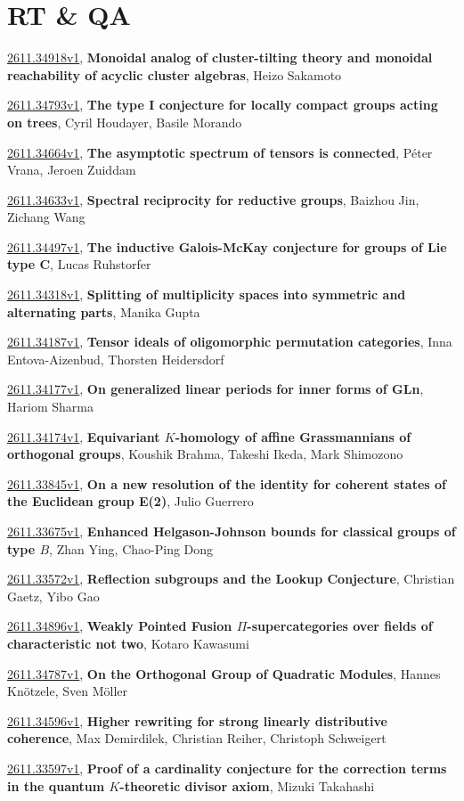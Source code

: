 \documentclass[9pt, a4paper]{article}
\theoremstyle{plain}
\theoremstyle{definition}
\theoremstyle{remark}
\newcommand{\arxiv}[3]{\href{https://arxiv.org/abs/#1}{#1}, \textbf{\textcolor{arxivblue}{#2}}, #3}
\begin{document}

\section{RT \& QA}
\arxiv{2611.34918v1}{Monoidal analog of cluster-tilting theory and monoidal reachability of acyclic cluster algebras}{Heizo Sakamoto}

\arxiv{2611.34793v1}{The type I conjecture for locally compact groups acting on trees}{Cyril Houdayer, Basile Morando}

\arxiv{2611.34664v1}{The asymptotic spectrum of tensors is connected}{Péter Vrana, Jeroen Zuiddam}

\arxiv{2611.34633v1}{Spectral reciprocity for reductive groups}{Baizhou Jin, Zichang Wang}

\arxiv{2611.34497v1}{The inductive Galois-McKay conjecture for groups of Lie type C}{Lucas Ruhstorfer}

\arxiv{2611.34318v1}{Splitting of multiplicity spaces into symmetric and alternating parts}{Manika Gupta}

\arxiv{2611.34187v1}{Tensor ideals of oligomorphic permutation categories}{Inna Entova-Aizenbud, Thorsten Heidersdorf}

\arxiv{2611.34177v1}{On generalized linear periods for inner forms of GLn}{Hariom Sharma}

\arxiv{2611.34174v1}{Equivariant $K$-homology of affine Grassmannians of orthogonal groups}{Koushik Brahma, Takeshi Ikeda, Mark Shimozono}

\arxiv{2611.33845v1}{On a new resolution of the identity for coherent states of the Euclidean group E(2)}{Julio Guerrero}

\arxiv{2611.33675v1}{Enhanced Helgason-Johnson bounds for classical groups of type $B$}{Zhan Ying, Chao-Ping Dong}

\arxiv{2611.33572v1}{Reflection subgroups and the Lookup Conjecture}{Christian Gaetz, Yibo Gao}

\arxiv{2611.34896v1}{Weakly Pointed Fusion $Π$-supercategories over fields of characteristic not two}{Kotaro Kawasumi}

\arxiv{2611.34787v1}{On the Orthogonal Group of Quadratic Modules}{Hannes Knötzele, Sven Möller}

\arxiv{2611.34596v1}{Higher rewriting for strong linearly distributive coherence}{Max Demirdilek, Christian Reiher, Christoph Schweigert}

\arxiv{2611.33597v1}{Proof of a cardinality conjecture for the correction terms in the quantum $K$-theoretic divisor axiom}{Mizuki Takahashi}

\end{document}
